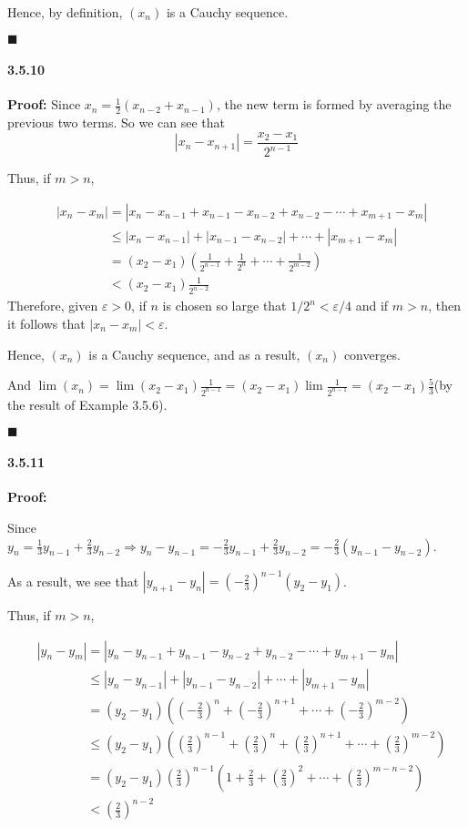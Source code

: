 \documentclass[11pt]{article}
\newcommand{\qed}{
	\begin{flushright}
		$\blacksquare$
	\end{flushright}}
\begin{document}
		Hence, by definition, $(x_n)$ is a Cauchy sequence.
		\qed 
	\paragraph{3.5.10}\textbf{Proof:}
		Since $x_n = \frac{1}{2}(x_{n - 2} + x_{n - 1})$, the new term is formed by averaging the previous two terms. So we can see that
			\[|x_n - x_{n + 1}| = \frac{x_2 - x_1}{2^{n - 1}}\]
		
		Thus, if $m > n$,
		
		\begin{align}
			&|x_n - x_m| = |x_n - x_{n - 1} + x_{n - 1} - x_{n - 2} + x_{n - 2} - \cdots + x_{m + 1} - x_m|\nonumber\\
			&\phantom{|x_n - x_m|} \leq |x_n - x_{n - 1}| + |x_{n - 1} - x_{n - 2}| + \cdots + |x_{m + 1} - x_m|\nonumber\\
			&\phantom{|x_n - x_m|} = (x_2 - x_1)(\frac{1}{2^{n - 1}} +  \frac{1}{2^{n}} + \cdots + \frac{1}{2^{m - 2}})\nonumber\\
			&\phantom{|x_n - x_m|} < (x_2 - x_1)\frac{1}{2^{n - 2}}\nonumber
		\end{align}
		Therefore, given $\varepsilon > 0$, if $n$ is chosen so large that $1/2^n < \varepsilon/4$ and if $m > n$, then it follows that $|x_n - x_m| < \varepsilon$.
		
		Hence, $(x_n)$ is a Cauchy sequence, and as a result, $(x_n)$ converges.
		
		And $\lim (x_n) = \lim (x_2 - x_1)\frac{1}{2^{n - 1}} = (x_2 - x_1)\lim \frac{1}{2^{n - 1}} = (x_2 - x_1)\frac{5}{3}$(by the result of Example 3.5.6).
		\qed
	\paragraph{3.5.11}\textbf{Proof:}
	
	Since $y_n = \frac{1}{3}y_{n - 1} + \frac{2}{3}y_{n - 2} \Rightarrow y_n - y_{n - 1} = -\frac{2}{3} y_{n - 1} + \frac{2}{3} y_{n - 2} = -\frac{2}{3}(y_{n - 1} - y_{n - 2})$.
	
	As a result, we see that $|y_{n + 1} - y_n| = (-\frac{2}{3})^{n - 1}(y_2 - y_1)$.
	
	Thus, if $m > n$,
	
	\begin{align}
		&|y_n - y_m| = |y_n - y_{n - 1} + y_{n - 1} - y_{n - 2} + y_{n - 2} - \cdots + y_{m + 1} - y_m|\nonumber\\
		&\phantom{|y_n - y_m|} \leq |y_n - y_{n - 1}| + |y_{n - 1} - y_{n - 2}| + \cdots + |y_{m + 1} - y_m|\nonumber\\
		&\phantom{|y_n - y_m|} = (y_2 - y_1)((-\frac{2}{3})^n +  (-\frac{2}{3})^{n + 1} + \cdots + (-\frac{2}{3})^{m - 2})\nonumber\\
		&\phantom{|y_n - y_m|} \leq (y_2 - y_1)((\frac{2}{3})^{n - 1} + (\frac{2}{3})^n +  (\frac{2}{3})^{n + 1} + \cdots + (\frac{2}{3})^{m - 2})\nonumber\\
		&\phantom{|y_n - y_m|} = (y_2 - y_1)(\frac{2}{3})^{n - 1}(1 + \frac{2}{3} + (\frac{2}{3})^2 + \cdots + (\frac{2}{3})^{m - n - 2})\nonumber\\
		&\phantom{|y_n - y_m|} < (\frac{2}{3})^{n - 2}
	\end{align}
	
\end{document}
